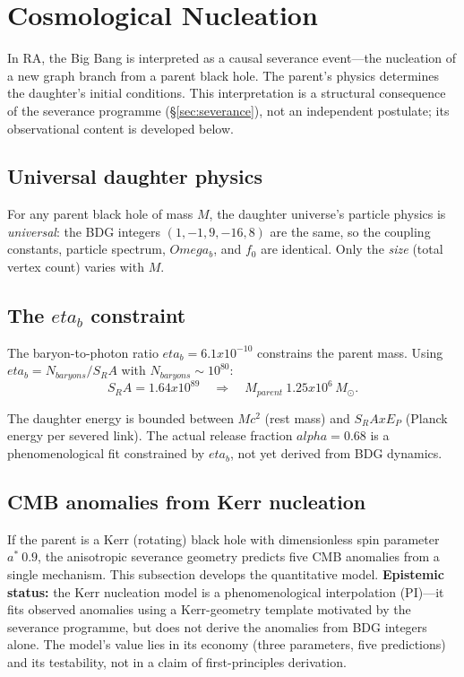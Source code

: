 \documentclass[11pt]{article}
\def\Omega{Omega}%
\def\alpha{alpha}%
\def\eta{eta}%
\def\mathrm#1{#1}%
\def\times{x}%
\def\approx{~}%
\def\SRa{S_RA}%
\newcommand{\SRa}{S_{\mathrm{RA}}}
\begin{document}
\section{Cosmological Nucleation}
\label{sec:nucleation}

In RA, the Big Bang is interpreted as a causal severance event---the nucleation of a new graph branch from a parent black hole. The parent's physics determines the daughter's initial conditions. This interpretation is a structural consequence of the severance programme (\S\ref{sec:severance}), not an independent postulate; its observational content is developed below.

\subsection{Universal daughter physics}

For any parent black hole of mass $M$, the daughter universe's particle physics is \emph{universal}: the BDG integers $(1,-1,9,-16,8)$ are the same, so the coupling constants, particle spectrum, $\Omega_b$, and $f_0$ are identical. Only the \emph{size} (total vertex count) varies with $M$.

\subsection{The $\eta_b$ constraint}

The baryon-to-photon ratio $\eta_b=6.1\times 10^{-10}$ constrains the parent mass. Using $\eta_b=N_{\mathrm{baryons}}/\SRa$ with $N_{\mathrm{baryons}}\sim 10^{80}$:
\begin{equation}
\SRa = 1.64\times 10^{89} \quad\Longrightarrow\quad M_{\mathrm{parent}}\approx 1.25\times 10^6\,M_\odot.
\end{equation}

The daughter energy is bounded between $Mc^2$ (rest mass) and $\SRa\times E_P$ (Planck energy per severed link). The actual release fraction $\alpha=0.68$ is a phenomenological fit constrained by $\eta_b$, not yet derived from BDG dynamics.

\subsection{CMB anomalies from Kerr nucleation}
\label{sec:cmb_anomalies}

If the parent is a Kerr (rotating) black hole with dimensionless spin parameter $a^* \approx 0.9$, the anisotropic severance geometry predicts five CMB anomalies from a single mechanism. This subsection develops the quantitative model. \textbf{Epistemic status:} the Kerr nucleation model is a phenomenological interpolation (PI)---it fits observed anomalies using a Kerr-geometry template motivated by the severance programme, but does not derive the anomalies from BDG integers alone. The model's value lies in its economy (three parameters, five predictions) and its testability, not in a claim of first-principles derivation.
\end{document}
